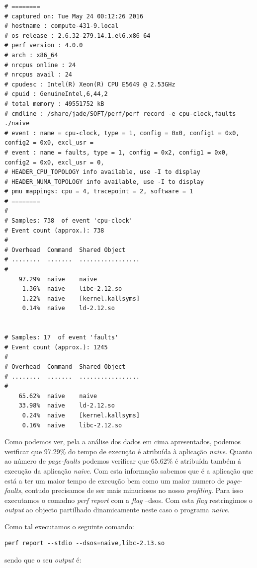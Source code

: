 \documentclass[conference,compsoc]{IEEEtran}
\begin{document}
\begin{lstlisting}
# ========
# captured on: Tue May 24 00:12:26 2016
# hostname : compute-431-9.local
# os release : 2.6.32-279.14.1.el6.x86_64
# perf version : 4.0.0
# arch : x86_64
# nrcpus online : 24
# nrcpus avail : 24
# cpudesc : Intel(R) Xeon(R) CPU E5649 @ 2.53GHz
# cpuid : GenuineIntel,6,44,2
# total memory : 49551752 kB
# cmdline : /share/jade/SOFT/perf/perf record -e cpu-clock,faults ./naive 
# event : name = cpu-clock, type = 1, config = 0x0, config1 = 0x0, config2 = 0x0, excl_usr =
# event : name = faults, type = 1, config = 0x2, config1 = 0x0, config2 = 0x0, excl_usr = 0,
# HEADER_CPU_TOPOLOGY info available, use -I to display
# HEADER_NUMA_TOPOLOGY info available, use -I to display
# pmu mappings: cpu = 4, tracepoint = 2, software = 1
# ========
#
# Samples: 738  of event 'cpu-clock'
# Event count (approx.): 738
#
# Overhead  Command  Shared Object    
# ........  .......  .................
#
    97.29%  naive    naive            
     1.36%  naive    libc-2.12.so     
     1.22%  naive    [kernel.kallsyms]
     0.14%  naive    ld-2.12.so       


# Samples: 17  of event 'faults'
# Event count (approx.): 1245
#
# Overhead  Command  Shared Object    
# ........  .......  .................
#
    65.62%  naive    naive            
    33.98%  naive    ld-2.12.so       
     0.24%  naive    [kernel.kallsyms]
     0.16%  naive    libc-2.12.so 
\end{lstlisting}

Como podemos ver, pela a análise dos dados em cima apresentados,  podemos verificar que 97.29\% do tempo de execução é atribuída à aplicação \textit{naive}. Quanto ao número de \textit{page-faults} podemos verificar que 65.62\% é atribuída também á execução da aplicação \textit{naive}. Com esta informação sabemos que é a aplicação que está a ter um maior tempo de execução bem como um maior numero de \textit{page-faults}, contudo precisamos de ser mais minuciosos no nosso \textit{profiling}. Para isso executamos o comadno \textit{perf report} com a \textit{flag} --dsos. Com esta  \textit{flag} restringimos o \textit{output} ao objecto partilhado dinamicamente neste caso o programa \textit{naive}.

Como tal executamos o seguinte comando:

\begin{lstlisting}
perf report --stdio --dsos=naive,libc-2.13.so 
\end{lstlisting}

sendo que o seu \textit{output} é:
\end{document}

